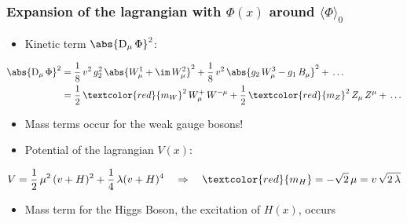 \documentclass[xcolor={usenames,dvipsnames,svgnames,table}]{beamer}
\newcommand{\av}[1]{\ensuremath{\langle #1 \rangle}\xspace}
\begin{document}
\begin{frame}
    \frametitle{Expansion of the lagrangian with $\Phi(x)$ around $\av{\Phi}_0$}
    \begin{itemize}
        \item Kinetic term $\abs{\mathrm{D}\xspace_\mu \, \Phi}^2$:
    \end{itemize}
    \begin{align*}
        \abs{\mathrm{D}\xspace_\mu \, \Phi}^2 &= \frac 1 8 \, v^2 \, g_2^2 \, \abs{W_\mu^1 + \im \, W_\mu^2}^2 + \frac 1 8 \, v^2 \, \abs{g_2 \, W_\mu^3 - g_1 \, B_\mu}^2 + \, \ldots \\
        &= \frac 1 2 \, \textcolor{red}{m_W}^2 \, W_\mu^+ \, W^{- \mu} + \frac 1 2 \, \textcolor{red}{m_Z}^2 \, Z_\mu \, Z^\mu + \, \ldots
    \end{align*}
    \begin{itemize}
        \item Mass terms occur for the weak gauge bosons!
        \item Potential of the lagrangian $V(x)$:
    \end{itemize}
    \begin{gather*}
        V = \frac 1 2 \, \mu^2 \, (v+H)^2 + \frac 1 4 \, \lambda (v+H)^4 \quad \Rightarrow \quad \textcolor{red}{m_H} = -\sqrt 2 \, \mu = v \, \sqrt{2 \, \lambda}
    \end{gather*}
    \begin{itemize}
        \item Mass term for the Higgs Boson, the excitation of $H(x)$, occurs
    \end{itemize}
\end{frame}
\end{document}
